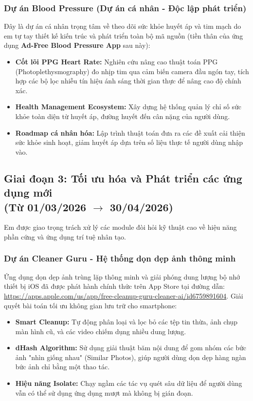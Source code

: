 \documentclass[12pt, a4paper]{article}
\begin{document}
\subsubsection{Dự án Blood Pressure (Dự án cá nhân - Độc lập phát triển)}
Đây là dự án cá nhân trọng tâm về theo dõi sức khỏe huyết áp và tim mạch do em tự tay thiết kế kiến trúc và phát triển toàn bộ mã nguồn (tiền thân của ứng dụng \textbf{Ad-Free Blood Pressure App} sau này):
\begin{itemize}
    \item \textbf{Cốt lõi PPG Heart Rate:} Nghiên cứu nâng cao thuật toán PPG (Photoplethysmography) đo nhịp tim qua cảm biến camera đầu ngón tay, tích hợp các bộ lọc nhiễu tín hiệu ánh sáng thời gian thực để nâng cao độ chính xác.
    \item \textbf{Health Management Ecosystem:} Xây dựng hệ thống quản lý chỉ số sức khỏe toàn diện từ huyết áp, đường huyết đến cân nặng của người dùng.
    \item \textbf{Roadmap cá nhân hóa:} Lập trình thuật toán đưa ra các đề xuất cải thiện sức khỏe sinh hoạt, giảm huyết áp dựa trên số liệu thực tế người dùng nhập vào.
\end{itemize}

\subsection[Giai đoạn 3: Tối ưu hóa và Phát triển các ứng dụng mới (Từ 01/03/2026 đến 30/04/2026)]{Giai đoạn 3: Tối ưu hóa và Phát triển các ứng dụng mới \\(Từ 01/03/2026 $\rightarrow$ 30/04/2026)}
Em được giao trọng trách xử lý các module đòi hỏi kỹ thuật cao về hiệu năng phần cứng và ứng dụng trí tuệ nhân tạo.
\subsubsection{Dự án Cleaner Guru - Hệ thống dọn dẹp ảnh thông minh}
Ứng dụng dọn dẹp ảnh trùng lặp thông minh và giải phóng dung lượng bộ nhớ thiết bị iOS đã được phát hành chính thức trên App Store tại đường dẫn: \url{https://apps.apple.com/us/app/free-cleanup-guru-cleaner-ai/id6759891604}.
Giải quyết bài toán tối ưu không gian lưu trữ cho smartphone:
\begin{itemize}
    \item \textbf{Smart Cleanup:} Tự động phân loại và lọc bỏ các tệp tin thừa, ảnh chụp màn hình cũ, và các video chiếm dụng nhiều dung lượng.
    \item \textbf{dHash Algorithm:} Sử dụng giải thuật băm nội dung để gom nhóm các bức ảnh "nhìn giống nhau" (Similar Photos), giúp người dùng dọn dẹp hàng ngàn bức ảnh chỉ bằng một thao tác.
    \item \textbf{Hiệu năng Isolate:} Chạy ngầm các tác vụ quét sâu dữ liệu để người dùng vẫn có thể sử dụng ứng dụng mượt mà không bị gián đoạn.
\end{itemize}
\end{document}
